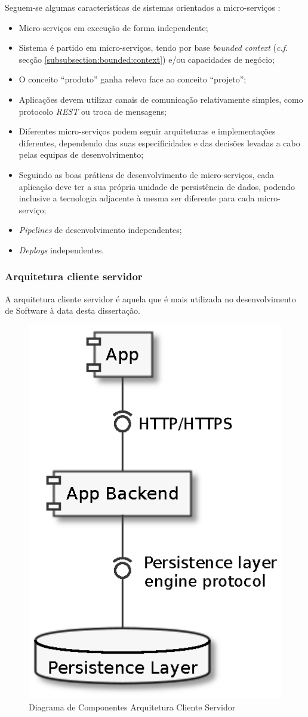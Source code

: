Seguem-se algumas características de sistemas orientados a micro-serviços \cite{microservices}:
\begin{itemize}
\item Micro-serviços em execução de forma independente;
\item Sistema é partido em micro-serviços, tendo por base \emph{bounded context} (\emph{c.f.} secção \ref{subsubsection:bounded:context}) e/ou capacidades de negócio;
\item O conceito “produto” ganha relevo face ao conceito “projeto”;
\item Aplicações devem utilizar canais de comunicação relativamente simples, como protocolo \emph{\acrshort{REST}} ou troca de mensagens;
\item Diferentes micro-serviços podem seguir arquiteturas e implementações diferentes, dependendo das suas especificidades e das decisões levadas a cabo pelas equipas de desenvolvimento;
\item Seguindo as boas práticas de desenvolvimento de micro-serviços, cada aplicação deve ter a sua própria unidade de persistência de dados, podendo inclusive a tecnologia adjacente à mesma ser diferente para cada micro-serviço;
\item \emph{Pipelines} de desenvolvimento independentes;
\item \emph{Deploys} independentes.
\end{itemize}

\subsubsection{Arquitetura cliente servidor \label{estado_arte_cliente_servidor}}
A arquitetura cliente servidor é aquela que é mais utilizada no desenvolvimento de Software à data desta dissertação. 

\begin{figure}[H]
    \begin{center}
    \includegraphics[height=0.5 \textwidth]{figures/actual_web.eps}
    \caption{Diagrama de Componentes Arquitetura Cliente Servidor}
    \end{center}
\end{figure}

